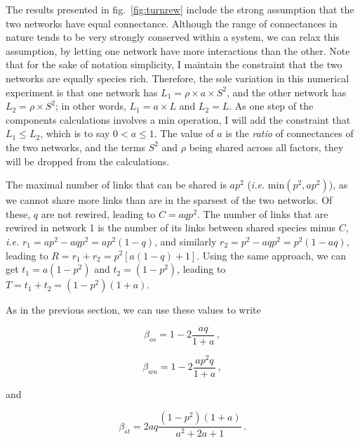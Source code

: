 \documentclass[10pt,oneside]{article}
\begin{document}
The results presented in fig.~\ref{fig:turnrew} include the strong
assumption that the two networks have equal connectance. Although the
range of connectances in nature tends to be very strongly conserved
within a system, we can relax this assumption, by letting one network
have more interactions than the other. Note that for the sake of
notation simplicity, I maintain the constraint that the two networks are
equally species rich. Therefore, the sole variation in this numerical
experiment is that one network has \(L_1 = \rho\times a\times S^2\), and
the other network has \(L_2 = \rho\times S^2\); in other words,
\(L_1 = a\times L\) and \(L_2 = L\). As one step of the components
calculations involves a \(\text{min}\) operation, I will add the
constraint that \(L_1 \le L_2\), which is to say \(0 < a \le 1\). The
value of \(a\) is the \emph{ratio} of connectances of the two networks,
and the terms \(S^2\) and \(\rho\) being shared across all factors, they
will be dropped from the calculations.

The maximal number of links that can be shared is \(ap^2\) (\emph{i.e.}
\(\text{min}(p^2, ap^2)\)), as we cannot share more links than are in
the sparsest of the two networks. Of these, \(q\) are not rewired,
leading to \(C = aqp^2\). The number of links that are rewired in
network 1 is the number of its links between shared species minus \(C\),
\emph{i.e.} \(r_1 = ap^2 - aqp^2 = ap^2(1-q)\), and similarly
\(r_2 = p^2 - aqp^2 = p^2(1-aq)\), leading to
\(R = r_1 + r_2 = p^2 \left[a(1-q)+1\right]\). Using the same approach,
we can get \(t_1 = a(1-p^2)\) and \(t_2 = (1-p^2)\), leading to
\(T = t_1 + t_2 = (1-p^2)(1+a)\).

As in the previous section, we can use these values to write

\[\beta_{os} = 1 - 2\frac{aq}{1+a}\,,\]

\[\beta_{wn} = 1 - 2\frac{ap^2q}{1+a}\,,\]

and

\[\beta_{st} = 2aq\frac{(1-p^2)(1+a)}{a^2 + 2a + 1}\,.\]
\end{document}
